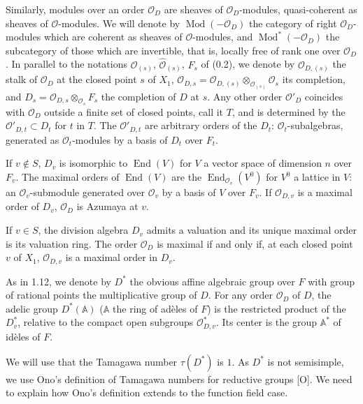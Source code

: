 \documentclass[10pt]{article}
\newcommand{\Adele}{\mathbb A}
\newcommand{\End}{\operatorname{End}}
\newcommand{\OD}{\mathcal O_D}
\newcommand{\OO}{\mathcal O}
\theoremstyle{deligne}
\newcommand{\heading}[1]{\vspace{0.7em}\noindent{\bfseries #1}\quad}
\begin{document}
Similarly, modules over an order $\OD$ are sheaves of $\OD$-modules, quasi-coherent as sheaves of $\OO$-modules. We will denote by $\operatorname{Mod}(-\OD)$ the category of right $\OD$-modules which are coherent as sheaves of $\OO$-modules, and $\operatorname{Mod}^*(-\OD)$ the subcategory of those which are invertible, that is, locally free of rank one over $\OD$. In parallel to the notations $\OO_{(s)}$, $\widehat{\OO}_{(s)}$, $F_s$ of (0.2), we denote by $\mathcal O_{D,(s)}$ the stalk of $\OD$ at the closed point $s$ of $X_1$, $\mathcal O_{D,s}=\mathcal O_{D,(s)}\otimes_{\OO_{(s)}}\OO_s$ its completion, and $D_s=\mathcal O_{D,s}\otimes_{\OO_s}F_s$ the completion of $D$ at $s$. Any other order $\mathcal O'_D$ coincides with $\OD$ outside a finite set of closed points, call it $T$, and is determined by the $\mathcal O'_{D,t}\subset D_t$ for $t$ in $T$. The $\mathcal O'_{D,t}$ are arbitrary orders of the $D_t$: $\OO_t$-subalgebras, generated as $\OO_t$-modules by a basis of $D_t$ over $F_t$.

If $v\notin S$, $D_v$ is isomorphic to $\End(V)$ for $V$ a vector space of dimension $n$ over $F_v$. The maximal orders of $\End(V)$ are the $\End_{\OO_v}(V^0)$ for $V^0$ a lattice in $V$: an $\OO_v$-submodule generated over $\OO_v$ by a basis of $V$ over $F_v$. If $\mathcal O_{D,v}$ is a maximal order of $D_v$, $\OD$ is Azumaya at $v$.

If $v\in S$, the division algebra $D_v$ admits a valuation and its unique maximal order is its valuation ring. The order $\OD$ is maximal if and only if, at each closed point $v$ of $X_1$, $\mathcal O_{D,v}$ is a maximal order in $D_v$.

\heading{3.7.} As in 1.12, we denote by $D^*$ the obvious affine algebraic group over $F$ with group of rational points the multiplicative group of $D$. For any order $\OD$ of $D$, the adelic group $D^*(\Adele)$ ($\Adele$ the ring of adèles of $F$) is the restricted product of the $D_v^*$, relative to the compact open subgroups $\mathcal O_{D,v}^*$. Its center is the group $\Adele^*$ of id\`eles of $F$.

\heading{3.8.} We will use that the Tamagawa number $\tau(D^*)$ is $1$. As $D^*$ is not semisimple, we use Ono's definition of Tamagawa numbers for reductive groups [O]. We need to explain how Ono's definition extends to the function field case.
\end{document}
